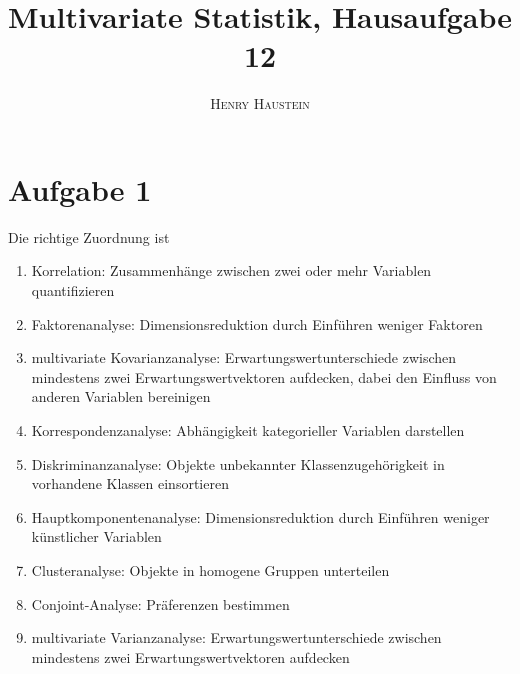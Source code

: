 \documentclass{article}
\title{\textbf{Multivariate Statistik, Hausaufgabe 12}}
\author{\textsc{Henry Haustein}}
\date{}
\begin{document}
	\maketitle
	
	\section*{Aufgabe 1}
	Die richtige Zuordnung ist
	\begin{enumerate}[label=(\alph*)]
		\item Korrelation: Zusammenhänge zwischen zwei oder mehr Variablen quantifizieren
		\item Faktorenanalyse: Dimensionsreduktion durch Einführen weniger Faktoren
		\item multivariate Kovarianzanalyse: Erwartungswertunterschiede zwischen mindestens zwei Erwartungswertvektoren aufdecken, dabei den Einfluss von anderen Variablen bereinigen
		\item Korrespondenzanalyse: Abhängigkeit kategorieller Variablen darstellen
		\item Diskriminanzanalyse: Objekte unbekannter Klassenzugehörigkeit in vorhandene Klassen einsortieren
		\item Hauptkomponentenanalyse: Dimensionsreduktion durch Einführen weniger künstlicher Variablen
		\item Clusteranalyse: Objekte in homogene Gruppen unterteilen
		\item Conjoint-Analyse: Präferenzen bestimmen
		\item multivariate Varianzanalyse: Erwartungswertunterschiede zwischen mindestens zwei Erwartungswertvektoren aufdecken
	\end{enumerate}
\end{document}

